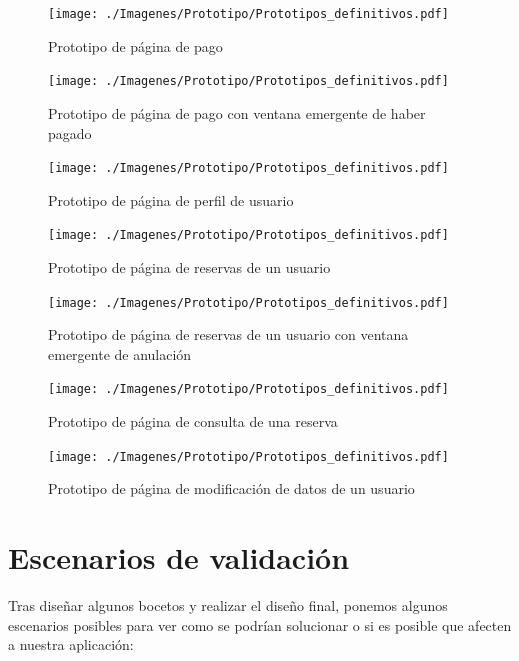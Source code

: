 \begin{figure}[H]
      \centering
      \texttt{[image: ./Imagenes/Prototipo/Prototipos\_definitivos.pdf]}
      \caption{Prototipo de página de pago}
      \label{fig:prot_pago}
\end{figure}

\begin{figure}[H]
      \centering
      \texttt{[image: ./Imagenes/Prototipo/Prototipos\_definitivos.pdf]}
      \caption{Prototipo de página de pago con ventana emergente de haber pagado}
      \label{fig:prot_pago_popup}
\end{figure}

\begin{figure}[H]
      \centering
      \texttt{[image: ./Imagenes/Prototipo/Prototipos\_definitivos.pdf]}
      \caption{Prototipo de página de perfil de usuario}
      \label{fig:prot_perfil}
\end{figure}

\begin{figure}[H]
      \centering
      \texttt{[image: ./Imagenes/Prototipo/Prototipos\_definitivos.pdf]}
      \caption{Prototipo de página de reservas de un usuario}
      \label{fig:prot_reservas_usuario}
\end{figure}

\begin{figure}[H]
      \centering
      \texttt{[image: ./Imagenes/Prototipo/Prototipos\_definitivos.pdf]}
      \caption{Prototipo de página de reservas de un usuario con ventana emergente de anulación}
      \label{fig:prot_reservas_usuario_popup}
\end{figure}

\begin{figure}[H]
      \centering
      \texttt{[image: ./Imagenes/Prototipo/Prototipos\_definitivos.pdf]}
      \caption{Prototipo de página de consulta de una reserva}
      \label{fig:prot_reservas_mod}
\end{figure}

\begin{figure}[H]
      \centering
      \texttt{[image: ./Imagenes/Prototipo/Prototipos\_definitivos.pdf]}
      \caption{Prototipo de página de modificación de datos de un usuario}
      \label{fig:prot_usuario_mod}
\end{figure}

\section{Escenarios de validación}
Tras diseñar algunos bocetos y realizar el diseño final, ponemos algunos
escenarios posibles para ver como se podrían solucionar o si es posible que
afecten a nuestra aplicación:


